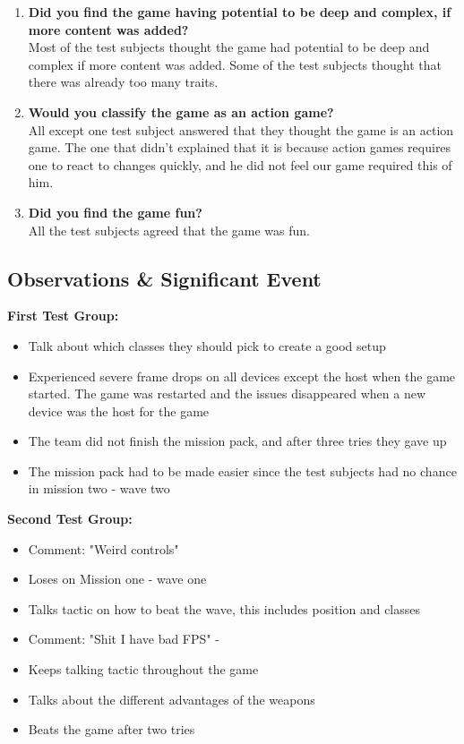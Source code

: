 \begin{enumerate}
\item \textbf{Did you find the game having potential to be deep and complex, if more content was added?}\vspace{4pt}\\
Most of the test subjects thought the game had potential to be deep and complex if more content was added.
Some of the test subjects thought that there was already too many traits.

\item \textbf{Would you classify the game as an action game?}\vspace{4pt}\\
All except one test subject answered that they thought the game is an action game.
The one that didn't explained that it is because action games requires one to react to changes quickly, and he did not feel our game required this of him.

\item \textbf{Did you find the game fun?}\vspace{4pt}\\
All the test subjects agreed that the game was fun.
\end{enumerate}

\subsection{Observations & Significant Event}
\textbf{First Test Group:}\\
\begin{itemize}
\item Talk about which classes they should pick to create a good setup
\item Experienced severe frame drops on all devices except the host  when the game started. The game was restarted and the issues disappeared when a new device was the host for the game
\item The team did not finish the mission pack, and after three tries they gave up
\item The mission pack had to be made easier since the test subjects had no chance in mission two - wave two
\end{itemize}

\textbf{Second Test Group:}\\
\begin{itemize}
\item Comment: "Weird controls"
\item Loses on Mission one - wave one
\item Talks tactic on how to beat the wave, this includes position and classes
\item Comment: "Shit I have bad FPS" - 
\item Keeps talking tactic throughout the game
\item Talks about the different advantages of the weapons
\item Beats the game after two tries
\end{itemize}

